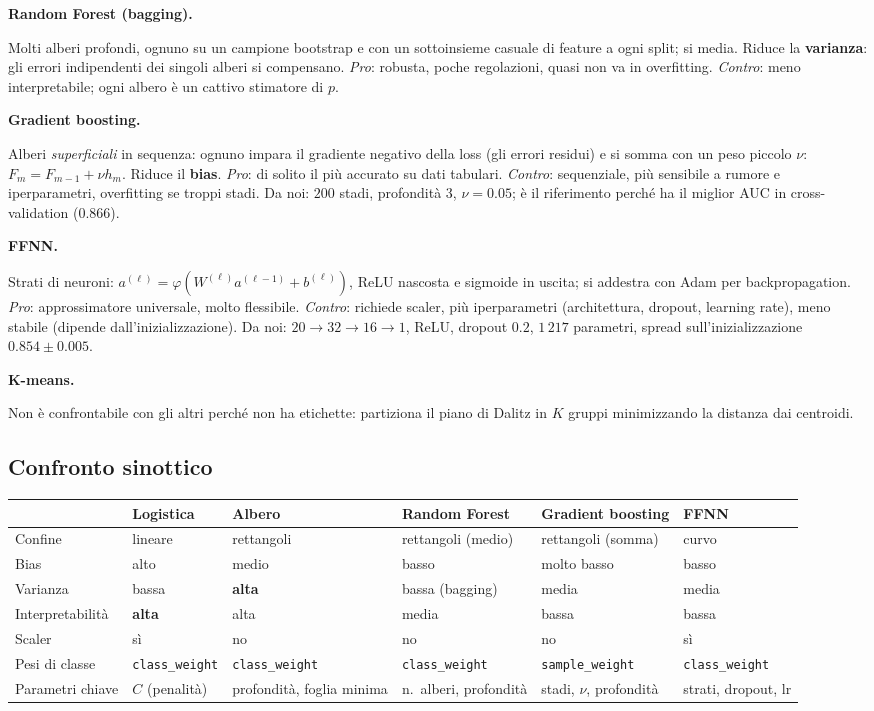 \documentclass[11pt,a4paper]{article}
\newcommand{\code}[1]{\texttt{#1}}
\newcommand{\dom}[1]{\par\smallskip\noindent\textbf{#1}\par\nopagebreak}
\begin{document}
\dom{Random Forest (bagging).} Molti alberi profondi, ognuno su un campione bootstrap e con un sottoinsieme casuale di feature a ogni split; si media. Riduce la \textbf{varianza}: gli errori indipendenti dei singoli alberi si compensano.
\emph{Pro}: robusta, poche regolazioni, quasi non va in overfitting. \emph{Contro}: meno interpretabile; ogni albero \`e un cattivo stimatore di $p$.

\dom{Gradient boosting.} Alberi \emph{superficiali} in sequenza: ognuno impara il gradiente negativo della loss (gli errori residui) e si somma con un peso piccolo $\nu$: $F_m=F_{m-1}+\nu h_m$. Riduce il \textbf{bias}.
\emph{Pro}: di solito il pi\`u accurato su dati tabulari. \emph{Contro}: sequenziale, pi\`u sensibile a rumore e iperparametri, overfitting se troppi stadi.
Da noi: $200$ stadi, profondit\`a $3$, $\nu=0.05$; \`e il riferimento perch\'e ha il miglior AUC in cross-validation ($0.866$).

\dom{FFNN.} Strati di neuroni: $a^{(\ell)}=\varphi(W^{(\ell)}a^{(\ell-1)}+b^{(\ell)})$, ReLU nascosta e sigmoide in uscita; si addestra con Adam per backpropagation.
\emph{Pro}: approssimatore universale, molto flessibile. \emph{Contro}: richiede scaler, pi\`u iperparametri (architettura, dropout, learning rate), meno stabile (dipende dall'inizializzazione).
Da noi: $20\to32\to16\to1$, ReLU, dropout $0.2$, $1\,217$ parametri, spread sull'inizializzazione $0.854\pm0.005$.

\dom{K-means.} Non \`e confrontabile con gli altri perch\'e non ha etichette: partiziona il piano di Dalitz in $K$ gruppi minimizzando la distanza dai centroidi.

\subsection*{Confronto sinottico}
\begin{center}
\small\setlength{\tabcolsep}{4pt}
\begin{tabular}{p{2.6cm}p{2.0cm}p{2.3cm}p{2.5cm}p{2.5cm}p{2.1cm}}
\toprule
 & Logistica & Albero & Random Forest & Gradient boosting & FFNN \\
\midrule
Confine & lineare & rettangoli & rettangoli (medio) & rettangoli (somma) & curvo \\
Bias & alto & medio & basso & molto basso & basso \\
Varianza & bassa & \textbf{alta} & bassa (bagging) & media & media \\
Interpretabilit\`a & \textbf{alta} & alta & media & bassa & bassa \\
Scaler & s\`i & no & no & no & s\`i \\
Pesi di classe & \code{class\_weight} & \code{class\_weight} & \code{class\_weight} & \code{sample\_weight} & \code{class\_weight} \\
Parametri chiave & $C$ (penalit\`a) & profondit\`a, foglia minima & n.\ alberi, profondit\`a & stadi, $\nu$, profondit\`a & strati, dropout, lr \\
\bottomrule
\end{tabular}
\end{center}
\end{document}
